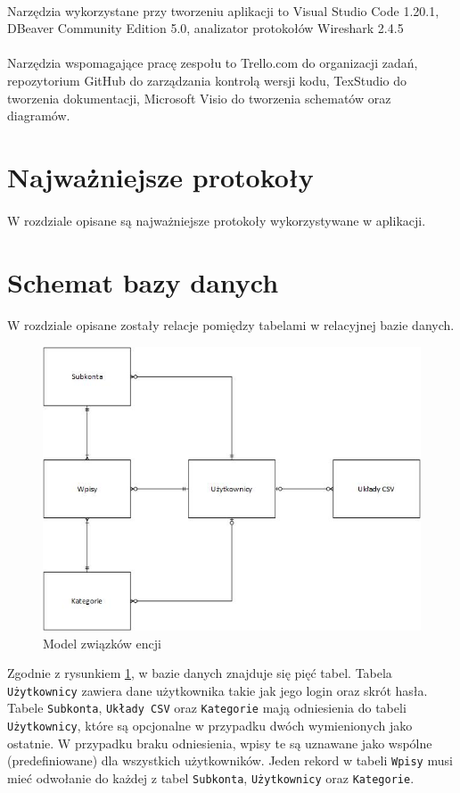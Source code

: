 \documentclass{article}
\begin{document}
	\paragraph*{} Narzędzia wykorzystane przy tworzeniu aplikacji to Visual Studio Code 1.20.1, DBeaver Community Edition 5.0, analizator protokołów Wireshark 2.4.5 \\
	\paragraph*{} Narzędzia wspomagające pracę zespołu to Trello.com do organizacji zadań, repozytorium GitHub do zarządzania kontrolą wersji kodu, TexStudio do tworzenia dokumentacji, Microsoft Visio do tworzenia schematów oraz diagramów.
	\section{Najważniejsze protokoły}
	\paragraph*{} W rozdziale opisane są najważniejsze protokoły wykorzystywane w aplikacji.
	\section{Schemat bazy danych}
	\paragraph{} W rozdziale opisane zostały relacje pomiędzy tabelami w relacyjnej bazie danych. 
	\begin{figure}[H]
		\centering
		\includegraphics[width=0.8\linewidth]{assets/er.jpg}
		\caption[]{Model związków encji}
		\label{fig:er}
	\end{figure}
	
	Zgodnie z rysunkiem \ref{fig:er}, w bazie danych znajduje się pięć tabel. Tabela \texttt{Użytkownicy} zawiera dane użytkownika takie jak jego login oraz skrót hasła. Tabele \texttt{Subkonta}, \texttt{Układy CSV} oraz \texttt{Kategorie} mają odniesienia do tabeli \texttt{Użytkownicy}, które są opcjonalne w przypadku dwóch wymienionych jako ostatnie. W przypadku braku odniesienia, wpisy te są uznawane jako wspólne (predefiniowane) dla wszystkich użytkowników. Jeden rekord w tabeli \texttt{Wpisy} musi mieć odwołanie do każdej z tabel \texttt{Subkonta}, \texttt{Użytkownicy} oraz \texttt{Kategorie}.
	
	
\end{document}
